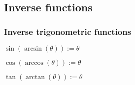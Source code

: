 
\subsection{Inverse functions}

\subsubsection{Inverse trigonometric functions}

$\sin (\arcsin (\theta )):=\theta $

$\cos (\arccos (\theta )):=\theta $

$\tan (\arctan (\theta )):=\theta $
